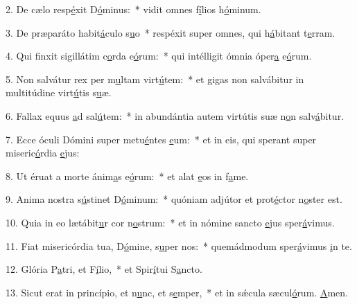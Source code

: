 2. De cælo resp\uline{é}xit D\uline{ó}minus:~* vidit omnes f\uline{í}lios h\uline{ó}minum.\par 
3. De præparáto habit\uline{á}culo s\uline{u}o~* respéxit super omnes, qui h\uline{á}bitant t\uline{e}rram.\par 
4. Qui finxit sigillátim c\uline{o}rda e\uline{ó}rum:~* qui intélligit ómnia óper\uline{a} e\uline{ó}rum.\par 
5. Non salvátur rex per m\uline{u}ltam virt\uline{ú}tem:~* et gigas non salvábitur in multitúdine virt\uline{ú}tis s\uline{u}æ.\par 
6. Fallax equus \uline{a}d sal\uline{ú}tem:~* in abundántia autem virtútis suæ n\uline{o}n salv\uline{á}bitur.\par 
7. Ecce óculi Dómini super metu\uline{é}ntes \uline{e}um:~* et in eis, qui sperant super miseric\uline{ó}rdia \uline{e}jus:\par 
8. Ut éruat a morte ánim\uline{a}s e\uline{ó}rum:~* et alat \uline{e}os in f\uline{a}me.\par 
9. Anima nostra s\uline{ú}stinet D\uline{ó}minum:~* quóniam adjútor et prot\uline{é}ctor n\uline{o}ster est.\par 
10. Quia in eo lætábit\uline{u}r cor n\uline{o}strum:~* et in nómine sancto \uline{e}jus sper\uline{á}vimus.\par 
11. Fiat misericórdia tua, D\uline{ó}mine, s\uline{u}per nos:~* quemádmodum sper\uline{á}vimus \uline{i}n te.\par 
12. Glória P\uline{a}tri, et F\uline{í}lio,~* et Spir\uline{í}tui S\uline{a}ncto.\par 
13. Sicut erat in princípio, et n\uline{u}nc, et s\uline{e}mper,~* et in sǽcula sæcul\uline{ó}rum. \uline{A}men.\par 
